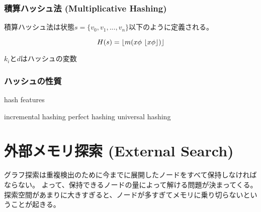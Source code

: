 \subsubsection{積算ハッシュ法 (Multiplicative Hashing)}
積算ハッシュ法は状態$s = \{v_0, v_1,...,v_n\}$以下のように定義される。

\begin{equation}
	H(s) = \lfloor m (x \phi \ \lfloor x \phi\rfloor)\rfloor
\end{equation}

$k_i$と$d$はハッシュの変数

\subsubsection{ハッシュの性質}

{\TODO hash features}

incremental hashing
perfect hashing
universal hashing








\section{外部メモリ探索 (External Search)}
\label{sec:external-search}


グラフ探索は重複検出のために今までに展開したノードをすべて保持しなければならない。
よって、保持できるノードの量によって解ける問題が決まってくる。
探索空間があまりに大きすぎると、ノードが多すぎてメモリに乗り切らないということが起きる。

